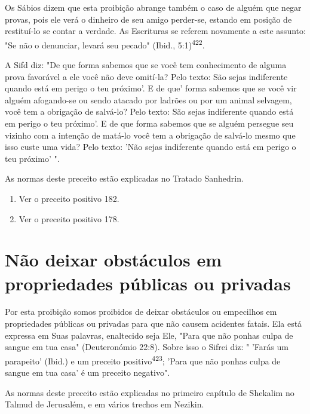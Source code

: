 Os Sábios dizem que esta proibição abrange também o caso de al­guém que
negar provas, pois ele verá o dinheiro de seu amigo perder-se, estan­do
em posição de restituí-lo se contar a verdade. As Escrituras se referem
nova­mente a este assunto: "Se não o denunciar, levará seu pecado"
(Ibid., 5:1)\textsuperscript{422}.

A Sifd diz: "De que forma sabemos que se você tem conhecimento de alguma
prova favorável a ele você não deve omití-la? Pelo texto: São sejas
indiferente quando está em perigo o teu próximo'. E de que' forma
sabemos que se você vir alguém afogando-se ou sendo atacado por ladrões
ou por um animal selvagem, você tem a obrigação de salvá-lo? Pelo texto:
São sejas indi­ferente quando está em perigo o teu próximo'. E de que
forma sabemos que se alguém persegue seu vizinho com a intenção de
matá-lo você tem a obriga­ção de salvá-lo mesmo que isso custe uma vida?
Pelo texto: 'Não sejas indife­rente quando está em perigo o teu próximo'
".


As normas deste preceito estão explicadas no Tratado Sanhedrin.

\begin{enumerate}
\def\labelenumi{\arabic{enumi}.}
\setcounter{enumi}{420}
\item
 
 Ver o preceito positivo 182.
 
\item
 
 Ver o preceito positivo 178.
 
\end{enumerate}



\section{Não deixar obstáculos em propriedades públicas ou privadas}

Por esta proibição somos proibidos de deixar obstáculos ou empe­cilhos
em propriedades públicas ou privadas para que não causem acidentes
fatais. Ela está expressa em Suas palavras, enaltecido seja Ele, "Para
que não ponhas culpa de sangue em tua casa" (Deuteronómio 22:8). Sobre
isso o Sifrei diz: " 'Farás um parapeito' (Ibid.) e um preceito
positivo\textsuperscript{423}; 'Para que não po­nhas culpa de sangue em
tua casa' é um preceito negativo".

As normas deste preceito estão explicadas no primeiro capítulo de
Shekalim no Talmud de Jerusalém, e em vários trechos em Nezikin.

